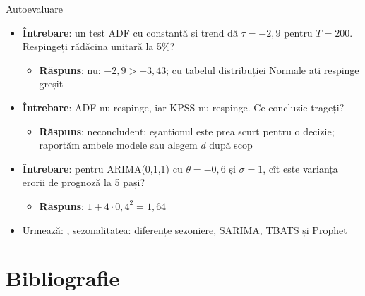 \begin{frame}{Autoevaluare}
\itemsize{\small}
\begin{itemize}
    \item \textbf{Întrebare}: un test ADF cu constantă și trend dă $\tau = -2{,}9$ pentru $T = 200$. Respingeți rădăcina unitară la 5\%?
    \begin{itemize}
        \item \textbf{Răspuns}: nu: $-2{,}9 > -3{,}43$; cu tabelul distribuției Normale ați respinge greșit
    \end{itemize}
    \item \textbf{Întrebare}: ADF nu respinge, iar KPSS nu respinge. Ce concluzie trageți?
    \begin{itemize}
        \item \textbf{Răspuns}: neconcludent: eșantionul este prea scurt pentru o decizie; raportăm ambele modele sau alegem $d$ după scop
    \end{itemize}
    \item \textbf{Întrebare}: pentru ARIMA(0,1,1) cu $\theta = -0{,}6$ și $\sigma = 1$, cît este varianța erorii de prognoză la 5 pași?
    \begin{itemize}
        \item \textbf{Răspuns}: $1 + 4 \cdot 0{,}4^2 = 1{,}64$
    \end{itemize}
    \item Urmează: , sezonalitatea: diferențe sezoniere, SARIMA, TBATS și Prophet
\end{itemize}
\end{frame}


\section{Bibliografie}

